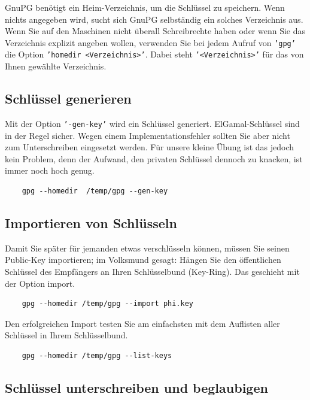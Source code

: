 GnuPG benötigt ein Heim-Verzeichnis, um die Schlüssel zu speichern. Wenn nichts angegeben
wird, sucht sich GnuPG selbständig ein solches Verzeichnis aus. Wenn Sie auf den
Maschinen nicht überall Schreibrechte haben oder wenn Sie das Verzeichnis explizit
angeben wollen, verwenden Sie bei jedem Aufruf von \texttt{'gpg'} die Option
\texttt{'homedir <Verzeichnis>'}. Dabei steht \texttt{'<Verzeichnis>'} für das von
Ihnen gewählte Verzeichnis.

\subsection{Schlüssel generieren}
\label{subsec:gpg-key-generieren}

Mit der Option \texttt{'-gen-key'} wird ein Schlüssel generiert. ElGamal-Schlüssel
sind in der Regel sicher. Wegen einem Implementationsfehler sollten Sie aber nicht
zum Unterschreiben eingesetzt werden. Für unsere kleine Übung ist das jedoch kein
Problem, denn der Aufwand, den privaten Schlüssel dennoch zu knacken, ist immer
noch hoch genug.

\begin{verbatim}
    gpg --homedir  /temp/gpg --gen-key
\end{verbatim}

\subsection{Importieren von Schlüsseln}
\label{subsec:gpg-key-import}

Damit Sie später für jemanden etwas verschlüsseln können, müssen Sie seinen
Public-Key importieren; im Volksmund gesagt: Hängen Sie den öffentlichen Schlüssel
des Empfängers an Ihren Schlüsselbund (Key-Ring). Das geschieht mit der Option import.

\begin{verbatim}
    gpg --homedir /temp/gpg --import phi.key
\end{verbatim}

Den erfolgreichen Import testen Sie am einfachsten mit dem Auflisten aller
Schlüssel in Ihrem Schlüsselbund.

\begin{verbatim}
    gpg --homedir /temp/gpg --list-keys
\end{verbatim}

\subsection{Schlüssel unterschreiben und beglaubigen}
\label{subsec:gpg-sign-key}

